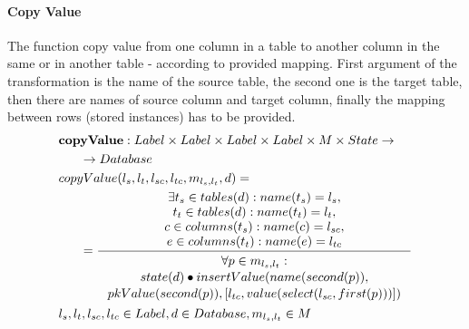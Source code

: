 \documentclass[11pt]{article}
\begin{document}
\paragraph{Copy Value} The function copy value from one column in a table to another column in the same or in another table - according to provided mapping. First argument of the transformation is the name of the source table, the second one is the target table, then there are names of source column and target column, finally the mapping between rows (stored instances) has to be provided.
\begin{align*}
&	\mathbf{copyValue} : Label \times Label \times Label \times Label \times M \times State \rightarrow \\ & \;\;\;\;\;\; \rightarrow Database \\
&	copyValue(l_s, l_t, l_{sc}, l_{tc}, m_{l_s, l_t}, d) = \\
& \;\;\;\;\;\; =	\inference{\exists t_s \in tables(d) : name(t_s) = l_s, \\ t_t \in tables(d) : name(t_t) = l_t, \\ c \in columns(t_s) : name(c) = l_{sc}, \\ e \in columns(t_t) : name(e) = l_{tc}}{\begin{gathered}
		\forall	p \in m_{l_s, l_t} :	\\ state(d) \bullet insertValue(name(second(p)), \\ pkValue(second(p)), [l_{tc},value(select(l_{sc}, first(p)))])
		\end{gathered}}\\
& 	l_s, l_t, l_{sc}, l_{tc} \in Label, d \in Database, m_{l_s, l_t} \in M
\end{align*}
\end{document}
